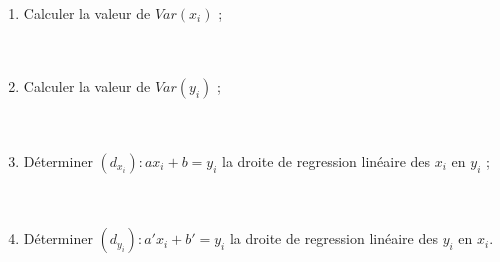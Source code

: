 \documentclass[11pt]{article}
\begin{document}
\begin{enumerate}
\\ \dtf \\ \dtf \\ \dtf
\item Calculer la valeur de  $Var(x_i)$  ; 
\\ \dtf \\ \dtf \\ \dtf
\item Calculer la valeur de  $Var(y_i)$  ; 
\\ \dtf \\ \dtf \\ \dtf
\item Déterminer   $(d_{x_i}) : ax_i+b=y_i$ la droite de regression
linéaire des $x_i$ en $y_i$ ; 
\\ \dtf \\ \dtf \\ \dtf
\item Déterminer   $(d_{y_i}) : a'x_i+b'=y_i$ la droite de regression
linéaire des $y_i$ en $x_i$. 
\\ \dtf \\ \dtf \\ \dtf

\end{enumerate}
\end{document}
